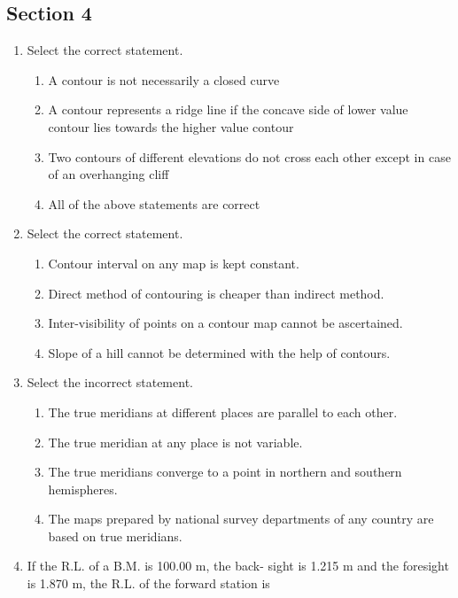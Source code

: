 \documentclass[11pt,a4paper]{article}
\begin{document}
\subsection*{Section 4}
\begin{enumerate}
\item{Select the correct statement.}
\begin{enumerate}[label=\Alph*.]
\item{A contour is not necessarily a closed curve}
\item{A contour represents a ridge line if the concave side of lower value contour lies towards the higher value contour}
\item{Two contours of different elevations do not cross each other except in case of an overhanging cliff}
\item{All of the above statements are correct}
\end{enumerate}
\item{Select the correct statement.}
\begin{enumerate}[label=\Alph*.]
\item{Contour interval on any map is kept constant.}
\item{Direct method of contouring is cheaper than indirect method.}
\item{Inter-visibility of points on a contour map cannot be ascertained.}
\item{Slope of a hill cannot be determined with the help of contours.}
\end{enumerate}
\item{Select the incorrect statement.}
\begin{enumerate}[label=\Alph*.]
\item{The true meridians at different places are parallel to each other.}
\item{The true meridian at any place is not variable.}
\item{The true meridians converge to a point in northern and southern hemispheres.}
\item{The maps prepared by national survey departments of any country are based on true meridians.}
\end{enumerate}
\item{If the R.L. of a B.M. is 100.00 m, the back- sight is 1.215 m and the foresight is 1.870 m, the R.L. of the forward station is}
\\
\end{enumerate}
\end{document}
